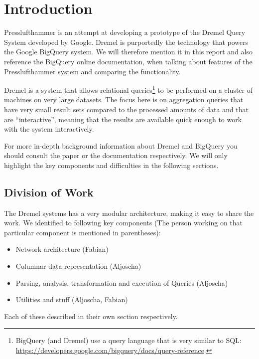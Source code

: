 
\section{Introduction}
Presslufthammer is an attempt at developing a prototype of the Dremel Query
System \cite{melnik2010dremel} developed by Google. Dremel is purportedly the
technology that powers the Google BigQuery \cite{bigquery} system. We will
therefore mention it in this report and also reference the BigQuery online
documentation, when talking about features of the Presslufthammer system
and comparing the functionality.

Dremel is a system that allows relational queries\footnote{BigQuery
(and Dremel) use a query language that is very similar to SQL: 
\url{https://developers.google.com/bigquery/docs/query-reference}.} to be
performed on a cluster of machines on very large datasets. The focus here
is on aggregation queries that have very small result sets compared to the
processed amounts of data and that are ``interactive'', meaning that the
results are available quick enough to work with the system interactively.

For more in-depth background information about Dremel and BigQuery you should
consult the paper or the documentation respectively. We will only highlight
the key components and difficulties in the following sections.

\subsection{Division of Work}

The Dremel systems has a very modular architecture, making it easy to share the
work. We identified to following key components (The person working on that
particular component is mentioned in parentheses):

\begin{itemize}
  \item Network architecture (Fabian)
  \item Columnar data representation (Aljoscha)
  \item Parsing, analysis, transformation and execution of Queries (Aljoscha)
  \item Utilities and stuff (Aljoscha, Fabian)
\end{itemize}

Each of these described in their own section respectively.

